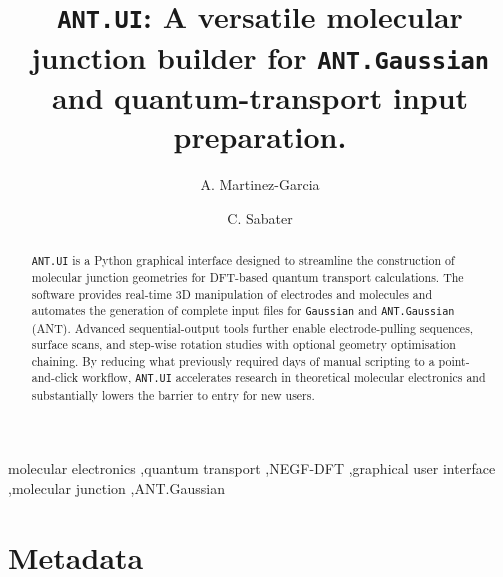 \documentclass[preprint,12pt, a4paper]{elsarticle}
\begin{document}
\renewcommand{\labelenumii}{\arabic{enumi}.\arabic{enumii}}

\begin{frontmatter}

\title{\texttt{ANT.UI}: A versatile molecular junction builder for \texttt{ANT.Gaussian} and quantum-transport input preparation.}

\author[1]{A. Martinez-Garcia}
\author[1]{C. Sabater}



\begin{abstract}
\texttt{ANT.UI} is a Python graphical interface designed to streamline the construction of molecular junction geometries for DFT-based quantum transport calculations. The software provides real-time 3D manipulation of electrodes and molecules and automates the generation of complete input files for \texttt{Gaussian} and \texttt{ANT.Gaussian} (ANT). Advanced sequential-output tools further enable electrode-pulling sequences, surface scans, and step-wise rotation studies with optional geometry optimisation chaining. By reducing what previously required days of manual scripting to a point-and-click workflow, \texttt{ANT.UI} accelerates research in theoretical molecular electronics and substantially lowers the barrier to entry for new users.
\end{abstract}

\begin{keyword}
molecular electronics \sep quantum transport \sep NEGF-DFT \sep graphical user interface \sep molecular junction \sep ANT.Gaussian
\end{keyword}

\end{frontmatter}

\section*{Metadata}
\label{}
\end{document}

